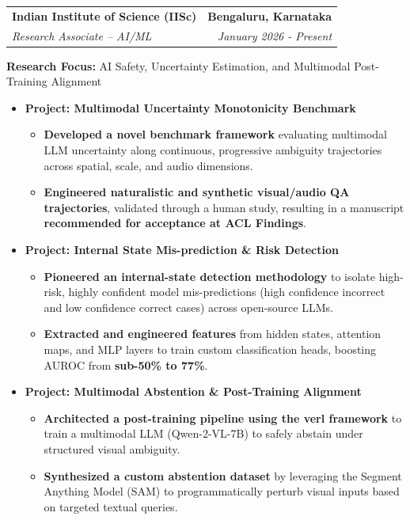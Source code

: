 \documentclass[letterpaper,11pt]{article}
\makeatletter
\newcommand{\resumeItem}[1]{
  \item\small{
    {#1 \vspace{-2pt}}
  }
}
\newcommand{\resumeSubheading}[4]{
  \vspace{-2pt}\item
    \begin{tabular*}{1.0\textwidth}[t]{l@{\extracolsep{\fill}}r}
      \textbf{#1} & \textbf{\small #2} \\
      \textit{\small#3} & \textit{\small #4} \\
    \end{tabular*}\vspace{-7pt}
}
\newcommand{\resumeItemListStart}{\begin{itemize}}
\newcommand{\resumeItemListEnd}{\end{itemize}\vspace{-5pt}}
\makeatother
\begin{document}
    \resumeSubheading
    {Indian Institute of Science (IISc)}{Bengaluru, Karnataka}
    {Research Associate -- AI/ML}{January 2026 - Present}
    
    \vspace{1pt}
    \small{\textbf{Research Focus:} AI Safety, Uncertainty Estimation, and Multimodal Post-Training Alignment}
    \vspace{-4pt}

        \resumeItemListStart
            \resumeItem{\textbf{Project: Multimodal Uncertainty Monotonicity Benchmark}}
            \begin{itemize}[leftmargin=0.2in]
                \resumeItem{\textbf{Developed a novel benchmark framework} evaluating multimodal LLM uncertainty along continuous, progressive ambiguity trajectories across spatial, scale, and audio dimensions.}
                \resumeItem{\textbf{Engineered naturalistic and synthetic visual/audio QA trajectories}, validated through a human study, resulting in a manuscript \textbf{recommended for acceptance at ACL Findings}.}
            \end{itemize}
            
            \vspace{2pt}
            \resumeItem{\textbf{Project: Internal State Mis-prediction \& Risk Detection}}
            \begin{itemize}[leftmargin=0.2in]
                \resumeItem{\textbf{Pioneered an internal-state detection methodology} to isolate high-risk, highly confident model mis-predictions (high confidence incorrect and low confidence correct cases) across open-source LLMs.}
                \resumeItem{\textbf{Extracted and engineered features} from hidden states, attention maps, and MLP layers to train custom classification heads, boosting AUROC from \textbf{sub-50\% to 77\%}.}
            \end{itemize}
            
            \vspace{2pt}
            \resumeItem{\textbf{Project: Multimodal Abstention \& Post-Training Alignment}}
            \begin{itemize}[leftmargin=0.2in]
                \resumeItem{\textbf{Architected a post-training pipeline using the verl framework} to train a multimodal LLM (Qwen-2-VL-7B) to safely abstain under structured visual ambiguity.}
                \resumeItem{\textbf{Synthesized a custom abstention dataset} by leveraging the Segment Anything Model (SAM) to programmatically perturb visual inputs based on targeted textual queries.}
            \end{itemize}
        \resumeItemListEnd
\end{document}
